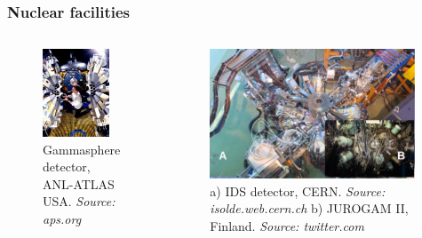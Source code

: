 \documentclass{beamer}
\begin{document}
\begin{frame}
	\frametitle{Nuclear facilities}
	\begin{columns}
		\begin{figure}
		\centering
		\includegraphics[width=0.86\textwidth]{figures/gsfig.jpg}
		\caption{Gammasphere detector, ANL-ATLAS USA. \textit{Source: aps.org}}
	\end{figure}
	\begin{figure}
		\centering
		\includegraphics[width=0.98\textwidth]{figures/isolde_cern_2.png}
		\caption{a) IDS detector, CERN. \textit{Source: isolde.web.cern.ch} b) JUROGAM II, Finland. \textit{Source: twitter.com}}
		\end{figure}
	\end{columns}
\end{frame}
\end{document}
